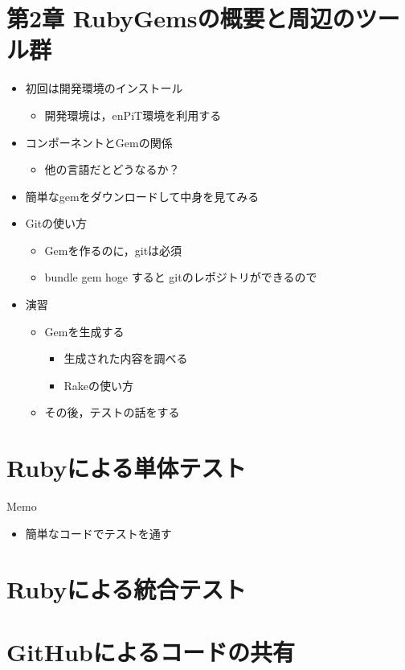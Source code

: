\documentclass[t, aspectratio=169]{beamer}
\begin{document}
\part{第2章 RubyGemsの概要と周辺のツール群}
\label{sec-2}

\begin{itemize}
\item 初回は開発環境のインストール
\begin{itemize}
\item 開発環境は，enPiT環境を利用する
\end{itemize}
\item コンポーネントとGemの関係
\begin{itemize}
\item 他の言語だとどうなるか？
\end{itemize}
\item 簡単なgemをダウンロードして中身を見てみる
\item Gitの使い方
\begin{itemize}
\item Gemを作るのに，gitは必須
\item bundle gem hoge すると gitのレポジトリができるので
\end{itemize}
\item 演習
\begin{itemize}
\item Gemを生成する
\begin{itemize}
\item 生成された内容を調べる
\item Rakeの使い方
\end{itemize}
\item その後，テストの話をする
\end{itemize}
\end{itemize}
\part{Rubyによる単体テスト}
\label{sec-3}
\begin{frame}[label=sec-3-0-1]{Memo}
\begin{itemize}
\item 簡単なコードでテストを通す
\end{itemize}
\end{frame}
\part{Rubyによる統合テスト}
\label{sec-4}

\part{GitHubによるコードの共有}
\label{sec-5}
\end{document}
